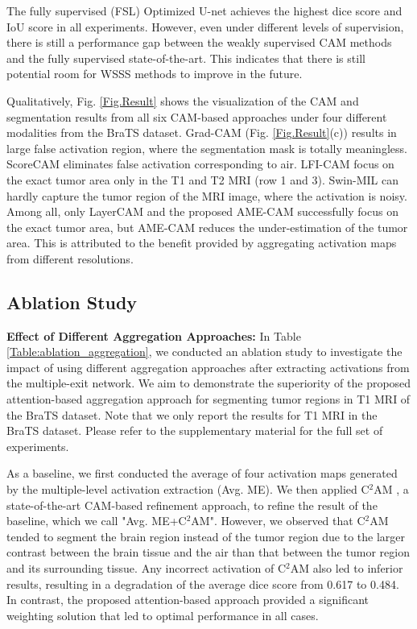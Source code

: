 The fully supervised (FSL) Optimized U-net achieves the highest dice score and IoU score in all experiments. However, even under different levels of supervision, there is still a performance gap between the weakly supervised CAM methods and the fully supervised state-of-the-art. This indicates that there is still potential room for WSSS methods to improve in the future.

Qualitatively, Fig. \ref{Fig.Result} shows the visualization of the CAM and segmentation results from all six CAM-based approaches under four different modalities from the BraTS dataset. Grad-CAM (Fig. \ref{Fig.Result}(c)) results in large false activation region, where the segmentation mask is totally meaningless. ScoreCAM eliminates false activation corresponding to air. LFI-CAM focus on the exact tumor area only in the T1 and T2 MRI (row 1 and 3). Swin-MIL can hardly capture the tumor region of the MRI image, where the activation is noisy. Among all, only LayerCAM and the proposed AME-CAM successfully focus on the exact tumor area, but AME-CAM reduces the under-estimation of the tumor area. This is attributed to the benefit provided by aggregating activation maps from different resolutions.


\subsection{Ablation Study}



\textbf{Effect of Different Aggregation Approaches:} In Table \ref{Table:ablation_aggregation}, we conducted an ablation study to investigate the impact of using different aggregation approaches after extracting activations from the multiple-exit network. We aim to demonstrate the superiority of the proposed attention-based aggregation approach for segmenting tumor regions in T1 MRI of the BraTS dataset. Note that we only report the results for T1 MRI in the BraTS dataset. Please refer to the supplementary material for the full set of experiments.

As a baseline, we first conducted the average of four activation maps generated by the multiple-level activation extraction (Avg. ME). We then applied C$^2$AM \cite{xie2022c2am}, a state-of-the-art CAM-based refinement approach, to refine the result of the baseline, which we call "Avg. ME+C$^2$AM". However, we observed that C$^2$AM tended to segment the brain region instead of the tumor region due to the larger contrast between the brain tissue and the air than that between the tumor region and its surrounding tissue. Any incorrect activation of C$^2$AM also led to inferior results, resulting in a degradation of the average dice score from 0.617 to 0.484. In contrast, the proposed attention-based approach provided a significant weighting solution that led to optimal performance in all cases.

